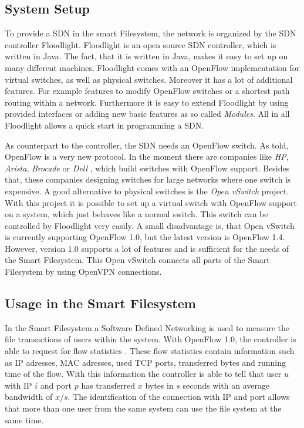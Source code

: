 \subsection{System Setup}
To provide a SDN in the smart Filesystem, the network is organized by the SDN controller Floodlight\cite{flood}. Floodlight is an open source SDN controller, which is written in Java. The fact, that it is written in Java, makes it easy to set up on many different machines. Floodlight comes with an OpenFlow implementation for virtual switches, as well as physical switches. Moreover it has a lot of additional features. For example features to modify OpenFlow switches or a shortest path routing within a network. Furthermore it is easy to extend Floodlight by using provided interfaces or adding new basic features as so called \textit{Modules}. All in all Floodlight allows a quick start in programming a SDN.

As counterpart to the controller, the SDN needs an OpenFlow switch. As told, OpenFlow is a very new protocol. In the moment there are companies like \textit{HP}, \textit{Arista}, \textit{Brocade} or \textit{Dell} , which build switches with OpenFlow support. Besides that, these companies designing switches for large networks where one switch is expensive. A good alternative to physical switches is the \textit{Open vSwitch} project\cite{ovs2}. With this project it is possible to set up a virtual switch with OpenFlow support on a system, which just behaves like a normal switch. This switch can be controlled by Floodlight very easily. A small disadvantage is, that Open vSwitch is currently supporting OpenFlow 1.0\cite{ovs}, but the latest version is OpenFlow 1.4\cite{ofspec4}. However, version 1.0 supports a lot of features and is sufficient for the needs of the Smart Filesystem.
This Open vSwitch connects all parts of the Smart Filesystem by using OpenVPN connections.     
   
\subsection{Usage in the Smart Filesystem}\label{usage}
In the Smart Filesystem a Software Defined Networking is used to measure the file transactions of users within the system. With OpenFlow 1.0, the controller is able to request for flow statistics \cite[P.\,31]{ofspec}. These flow statistics contain information such as IP adresses, MAC adresses, used TCP ports, transferred bytes and running time of the flow. With this information the controller is able to tell that user $u$ with IP $i$ and port $p$ has transferred $x$ bytes in $s$ seconds with an average bandwidth of $x/s$. The identification of the connection with IP and port allows that more than one user from the same system can use the file system at the same time.

